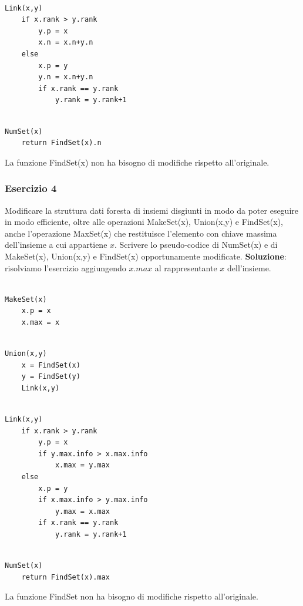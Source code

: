 \begin{lstlisting}

Link(x,y)
	if x.rank > y.rank
		y.p = x
		x.n = x.n+y.n
	else
		x.p = y
		y.n = x.n+y.n
		if x.rank == y.rank
			y.rank = y.rank+1

\end{lstlisting}

\begin{lstlisting}

NumSet(x)
	return FindSet(x).n

\end{lstlisting}

La funzione FindSet(x) non ha bisogno di modifiche rispetto all'originale.

\subsubsection{Esercizio 4}

Modificare la struttura dati foresta di insiemi disgiunti in modo da poter eseguire in modo efficiente, oltre alle operazioni MakeSet(x), Union(x,y) e FindSet(x), anche l'operazione MaxSet(x) che restituisce l'elemento con chiave massima dell'insieme a cui appartiene $x$. Scrivere lo pseudo-codice di NumSet(x) e di MakeSet(x), Union(x,y) e FindSet(x) opportunamente modificate.
\linebreak
\linebreak
\textbf{Soluzione}: risolviamo l'esercizio aggiungendo $x.max$ al rappresentante $x$ dell'insieme.

\begin{lstlisting}

MakeSet(x)
	x.p = x
	x.max = x

\end{lstlisting}

\begin{lstlisting}
	
Union(x,y)
	x = FindSet(x)
	y = FindSet(y)
	Link(x,y)

\end{lstlisting}

\begin{lstlisting}

Link(x,y)
	if x.rank > y.rank
		y.p = x
		if y.max.info > x.max.info
			x.max = y.max
	else
		x.p = y
		if x.max.info > y.max.info
			y.max = x.max
		if x.rank == y.rank
			y.rank = y.rank+1

\end{lstlisting}

\begin{lstlisting}

NumSet(x)
	return FindSet(x).max

\end{lstlisting}

La funzione FindSet non ha bisogno di modifiche rispetto all'originale.